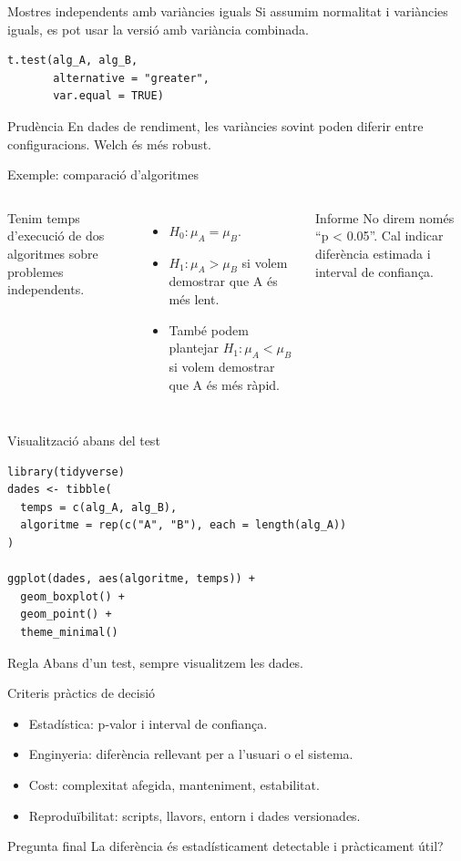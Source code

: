 \documentclass[10pt,aspectratio=169]{beamer}
\begin{document}
\begin{frame}[fragile]{Mostres independents amb variàncies iguals}
Si assumim normalitat i variàncies iguals, es pot usar la versió amb variància combinada.
\begin{lstlisting}
t.test(alg_A, alg_B,
       alternative = "greater",
       var.equal = TRUE)
\end{lstlisting}
\begin{alertblock}{Prudència}
En dades de rendiment, les variàncies sovint poden diferir entre configuracions. Welch és més robust.
\end{alertblock}
\end{frame}

\begin{frame}[fragile]{Exemple: comparació d'algoritmes}
\begin{columns}[T]
Tenim temps d'execució de dos algoritmes sobre problemes independents.
\begin{itemize}
  \item $H_0:\mu_A=\mu_B$.
  \item $H_1:\mu_A>\mu_B$ si volem demostrar que A és més lent.
  \item També podem plantejar $H_1:\mu_A<\mu_B$ si volem demostrar que A és més ràpid.
\end{itemize}
\begin{block}{Informe}
No direm només ``p < 0.05''. Cal indicar diferència estimada i interval de confiança.
\end{block}
\end{columns}
\end{frame}

\begin{frame}[fragile]{Visualització abans del test}
\begin{lstlisting}
library(tidyverse)
dades <- tibble(
  temps = c(alg_A, alg_B),
  algoritme = rep(c("A", "B"), each = length(alg_A))
)

ggplot(dades, aes(algoritme, temps)) +
  geom_boxplot() +
  geom_point() +
  theme_minimal()
\end{lstlisting}
\begin{block}{Regla}
Abans d'un test, sempre visualitzem les dades.
\end{block}
\end{frame}

\begin{frame}[fragile]{Criteris pràctics de decisió}
\begin{itemize}
  \item Estadística: p-valor i interval de confiança.
  \item Enginyeria: diferència rellevant per a l'usuari o el sistema.
  \item Cost: complexitat afegida, manteniment, estabilitat.
  \item Reproduïbilitat: scripts, llavors, entorn i dades versionades.
\end{itemize}
\begin{alertblock}{Pregunta final}
La diferència és estadísticament detectable i pràcticament útil?
\end{alertblock}
\end{frame}
\end{document}
